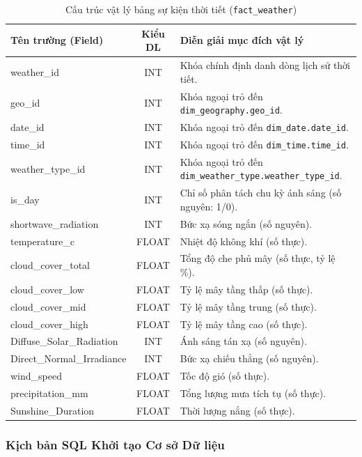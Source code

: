 \documentclass[12pt,a4paper]{article}
\begin{document}
\begin{table}[H]
\centering
\caption{Cấu trúc vật lý bảng sự kiện thời tiết (\texttt{fact\_weather})}
\label{tab:fact_weather_spec}
\renewcommand{\arraystretch}{1.4}
\begin{tabularx}{\textwidth}{p{5cm} c X}
\toprule
\textbf{Tên trường (Field)} & \textbf{Kiểu DL} & \textbf{Diễn giải mục đích vật lý} \\
\midrule
weather\_id & INT & Khóa chính định danh dòng lịch sử thời tiết. \\
geo\_id & INT & Khóa ngoại trỏ đến \texttt{dim\_geography.geo\_id}. \\
date\_id & INT & Khóa ngoại trỏ đến \texttt{dim\_date.date\_id}. \\
time\_id & INT & Khóa ngoại trỏ đến \texttt{dim\_time.time\_id}. \\
weather\_type\_id & INT & Khóa ngoại trỏ đến \texttt{dim\_weather\_type.weather\_type\_id}. \\
is\_day & INT & Chỉ số phân tách chu kỳ ánh sáng (số nguyên: 1/0). \\
shortwave\_radiation & INT & Bức xạ sóng ngắn (số nguyên). \\
temperature\_c & FLOAT & Nhiệt độ không khí (số thực). \\
cloud\_cover\_total & FLOAT & Tổng độ che phủ mây (số thực, tỷ lệ \%). \\
cloud\_cover\_low & FLOAT & Tỷ lệ mây tầng thấp (số thực). \\
cloud\_cover\_mid & FLOAT & Tỷ lệ mây tầng trung (số thực). \\
cloud\_cover\_high & FLOAT & Tỷ lệ mây tầng cao (số thực). \\
Diffuse\_Solar\_Radiation & INT & Ánh sáng tán xạ (số nguyên). \\
Direct\_Normal\_Irradiance & INT & Bức xạ chiếu thẳng (số nguyên). \\
wind\_speed & FLOAT & Tốc độ gió (số thực). \\
precipitation\_mm & FLOAT & Tổng lượng mưa tích tụ (số thực). \\
Sunshine\_Duration & FLOAT & Thời lượng nắng (số thực). \\
\bottomrule
\end{tabularx}
\end{table}

\newpage
\subsubsection{Kịch bản SQL Khởi tạo Cơ sở Dữ liệu}
\label{subsec:sql_scripts}
\end{document}
